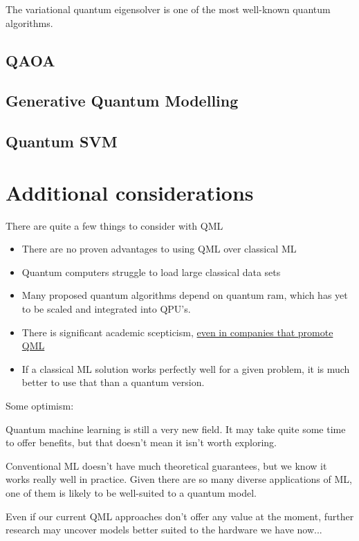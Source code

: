 \documentclass{book}
\begin{document}
The variational quantum eigensolver is one of the most well-known quantum algorithms. 

\subsection{QAOA}

\subsection{Generative Quantum Modelling}

\subsection{Quantum SVM} 

\section{Additional considerations}

There are quite a few things to consider with QML 
\begin{itemize}
    \item There are no proven advantages to using QML over classical ML 
    \item Quantum computers struggle to load large classical data sets 
    \item Many proposed quantum algorithms depend on quantum ram, which has yet to be scaled and integrated into QPU's. 
    \item There is significant academic scepticism, \href{https://www.youtube.com/watch?v=5UsJV2BNj2U&list=PLOFEBzvs-VvppIb0jg5_aDbmFs36DXD9w}{even in companies that promote QML}
    \item If a classical ML solution works perfectly well for a given problem, it is much better to use that than a quantum version. 
\end{itemize}


Some optimism: 

Quantum machine learning is still a very new field. It may take quite some time to offer benefits, but that doesn't mean it isn't worth exploring.

Conventional ML doesn't have much theoretical guarantees, but we know it works really well in practice. Given there are so many diverse applications of ML, one of them is likely to be well-suited to a quantum model.

Even if our current QML approaches don't offer any value at the moment, further research may uncover models better suited to the hardware we have now...
\end{document}
